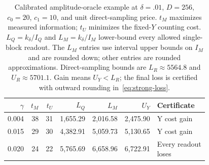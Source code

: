 \begin{table}[htbp]
\centering\small
\setlength{\tabcolsep}{4pt}
\begin{tabular}{rrrrrrl}
\toprule
$\gamma$ & $t_M$ & $t_U$ & $L_Q$ & $L_M$ & $U_Y$ & Certificate\\
\midrule
0.004 & 38 & 31 & 1,655.29 & 2,016.58 & 2,475.90 & Y cost gain\\
0.015 & 29 & 30 & 4,382.91 & 5,059.73 & 5,130.65 & Y cost gain\\
0.020 & 24 & 22 & 5,765.69 & 6,658.96 & 6,722.91 & \shortstack{Every readout\\loses}\\
\bottomrule\end{tabular}
\caption{Calibrated amplitude-oracle example at $\delta=.01$, $D=256$,
$c_0=20$, $c_1=10$, and unit direct-sampling price.
$t_M$ maximizes measured information; $t_U$ minimizes the fixed-$Y$ counting cost.
$L_Q=k_\delta/I_Q$ and $L_M=k_\delta/I_M$ lower-bound every allowed single-block readout.
The $L_M$ entries use interval upper bounds on $I_M$ and are rounded down;
other entries are rounded approximations. Direct-sampling bounds are
$L_R\approx5564.8$ and $U_R\approx5701.1$. Gain means $U_Y<L_R$;
the final loss is certified with outward rounding in~\eqref{eq:strong-loss}.}
\label{tab:amplitude-case}
\end{table}
